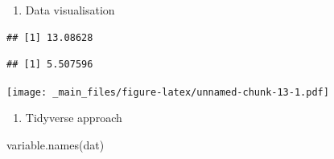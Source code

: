 \documentclass[
]{book}
\newenvironment{Shaded}{\begin{snugshade}}{\end{snugshade}}
\newcommand{\AttributeTok}[1]{\textcolor[rgb]{0.77,0.63,0.00}{#1}}
\newcommand{\CommentTok}[1]{\textcolor[rgb]{0.56,0.35,0.01}{\textit{#1}}}
\newcommand{\ConstantTok}[1]{\textcolor[rgb]{0.00,0.00,0.00}{#1}}
\newcommand{\FunctionTok}[1]{\textcolor[rgb]{0.00,0.00,0.00}{#1}}
\newcommand{\NormalTok}[1]{#1}
\newcommand{\SpecialCharTok}[1]{\textcolor[rgb]{0.00,0.00,0.00}{#1}}
\providecommand{\tightlist}{%
  \setlength{\itemsep}{0pt}\setlength{\parskip}{0pt}}
\begin{document}
\begin{enumerate}
\def\labelenumi{\arabic{enumi}.}
\setcounter{enumi}{3}
\tightlist
\item
  Data visualisation
\end{enumerate}

\begin{Shaded}
\end{Shaded}

\begin{verbatim}
## [1] 13.08628
\end{verbatim}

\begin{Shaded}
\end{Shaded}

\begin{verbatim}
## [1] 5.507596
\end{verbatim}

\begin{Shaded}
\end{Shaded}

\texttt{[image: \_main\_files/figure-latex/unnamed-chunk-13-1.pdf]}

\begin{enumerate}
\def\labelenumi{\arabic{enumi}.}
\setcounter{enumi}{4}
\tightlist
\item
  Tidyverse approach
\end{enumerate}

\begin{Shaded}
\begin{Highlighting}[]
\FunctionTok{variable.names}\NormalTok{(dat)}
\end{Highlighting}
\end{Shaded}
\end{document}
